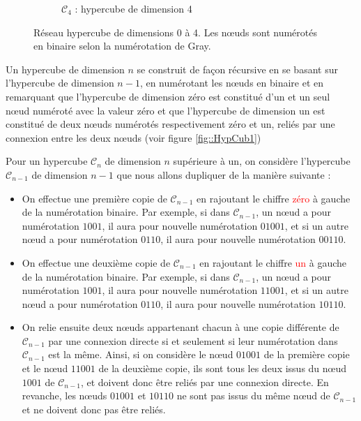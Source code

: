 \documentclass[fleqn,11pt]{article}
\begin{document}
\begin{figure}[h]
\begin{subfigure}[c]{0.46\textwidth}
\caption{$\mathcal{C}_{4}$ : hypercube de dimension 4}
\label{fig::HypCub4}
\end{subfigure}
\caption{Réseau hypercube de dimensions 0 à 4. Les nœuds sont numérotés en binaire selon la numérotation de Gray.}
\label{fig::hypercube}
\end{figure}

Un hypercube de dimension $n$ se construit de façon récursive en se basant sur l'hypercube de dimension $n-1$,
en numérotant les n{\oe}uds en binaire et en remarquant que l'hypercube de dimension zéro est constitué d'un et un seul n{\oe}ud numéroté avec la valeur zéro et que l'hypercube de dimension un est constitué de deux n{\oe}uds numérotés respectivement zéro et un, reliés par une connexion entre les deux n{\oe}uds (voir figure \ref{fig::HypCub1})

Pour un hypercube $\mathcal{C}_{n}$ de dimension $n$ supérieure à un, on considère l'hypercube $\mathcal{C}_{n-1}$ de dimension $n-1$ que nous allons dupliquer de la manière suivante :
\begin{itemize}
    \item On effectue une première copie de $\mathcal{C}_{n-1}$ en rajoutant le chiffre \textcolor{red}{zéro} à gauche de la numérotation binaire. Par exemple, si dans $\mathcal{C}_{n-1}$, un n{\oe}ud a pour numérotation $1001$, il aura pour nouvelle numérotation $01001$, et si un autre n{\oe}ud a pour numérotation $0110$, il aura pour nouvelle numérotation
    $00110$.
    \item On effectue une deuxième copie de $\mathcal{C}_{n-1}$ en rajoutant le chiffre \textcolor{red}{un} à gauche de la numérotation binaire. Par exemple, si dans $\mathcal{C}_{n-1}$, un n{\oe}ud a pour numérotation $1001$, il aura pour nouvelle numérotation $11001$, et si un autre n{\oe}ud a pour numérotation $0110$, il aura pour nouvelle numérotation
    $10110$.
    \item On relie ensuite deux n{\oe}uds appartenant chacun à une copie différente de $\mathcal{C}_{n-1}$
    par une connexion directe si et seulement si leur numérotation dans $\mathcal{C}_{n-1}$ est la même. Ainsi,
    si on considère le n{\oe}ud $01001$ de la première copie et le n{\oe}ud $11001$ de la deuxième copie, ils sont
    tous les deux issus du n{\oe}ud $1001$ de $\mathcal{C}_{n-1}$, et doivent donc être reliés par une connexion directe.
    En revanche, les n{\oe}uds $01001$ et $10110$ ne sont pas issus du même n{\oe}ud de $\mathcal{C}_{n-1}$ et
    ne doivent donc pas être reliés.
\end{itemize}
\end{document}
